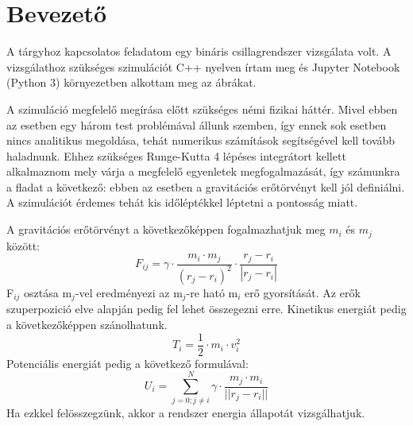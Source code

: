 \section{Bevezető}

A tárgyhoz kapcsolatos feladatom egy bináris csillagrendszer vizsgálata volt. A vizsgálathoz szükséges szimulációt C++ nyelven írtam meg és Jupyter Notebook (Python 3) környezetben alkottam meg az ábrákat.

A szimuláció megfelelő megírása előtt szükséges némi fizikai háttér. Mivel ebben az esetben egy három test problémával állunk szemben, így ennek sok esetben nincs analitikus megoldása, tehát numerikus számítások segítségével kell tovább haladnunk. Ehhez szükséges Runge-Kutta 4 lépéses integrátort kellett alkalmaznom mely várja a megfelelő egyenletek megfogalmazását, így számunkra a fladat a következő: ebben az esetben a gravitációs erőtörvényt kell jól definiálni. A szimulációt érdemes tehát kis időléptékkel léptetni a pontosság miatt.

A gravitációs erőtörvényt a következőképpen fogalmazhatjuk meg $m_i$ és $m_j$ között:
\begin{equation}
    F_{ij} = \gamma \cdot \frac{m_i \cdot m_j}{(r_j - r_i)^2} \cdot \frac{r_j - r_i}{|r_j - r_i|}
\end{equation}
F$_{ij}$ osztása m$_j$-vel eredményezi az m$_j$-re ható m$_i$ erő gyorsítását. Az erők szuperpozició elve alapján pedig fel lehet összegezni erre. Kinetikus energiát pedig a következőképpen szánolhatunk.
\begin{equation}
    T_i = \frac{1}{2} \cdot m_i \cdot v_i^2
\end{equation}
Potenciális energiát pedig a következő formulával:
\begin{equation}
    U_i = \sum_{j=0; j\neq i}^N \gamma \cdot \frac{m_j \cdot m_i}{||r_j - r_i||}
\end{equation}
Ha ezkkel felösszegzünk, akkor a rendszer energia állapotát vizsgálhatjuk.